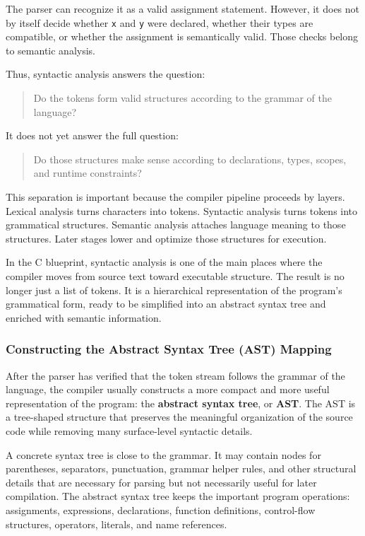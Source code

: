 The parser can recognize it as a valid assignment statement. However, it does not by itself decide whether \texttt{x} and \texttt{y} were declared, whether their types are compatible, or whether the assignment is semantically valid. Those checks belong to semantic analysis.

Thus, syntactic analysis answers the question:

\begin{quote}
Do the tokens form valid structures according to the grammar of the language?
\end{quote}

It does not yet answer the full question:

\begin{quote}
Do those structures make sense according to declarations, types, scopes, and runtime constraints?
\end{quote}

This separation is important because the compiler pipeline proceeds by layers. Lexical analysis turns characters into tokens. Syntactic analysis turns tokens into grammatical structures. Semantic analysis attaches language meaning to those structures. Later stages lower and optimize those structures for execution.

In the C blueprint, syntactic analysis is one of the main places where the compiler moves from source text toward executable structure. The result is no longer just a list of tokens. It is a hierarchical representation of the program's grammatical form, ready to be simplified into an abstract syntax tree and enriched with semantic information.




\subsubsection{Constructing the Abstract Syntax Tree (AST) Mapping}

After the parser has verified that the token stream follows the grammar of the language, the compiler usually constructs a more compact and more useful representation of the program: the \textbf{abstract syntax tree}, or \textbf{AST}. The AST is a tree-shaped structure that preserves the meaningful organization of the source code while removing many surface-level syntactic details.

A concrete syntax tree is close to the grammar. It may contain nodes for parentheses, separators, punctuation, grammar helper rules, and other structural details that are necessary for parsing but not necessarily useful for later compilation. The abstract syntax tree keeps the important program operations: assignments, expressions, declarations, function definitions, control-flow structures, operators, literals, and name references.


